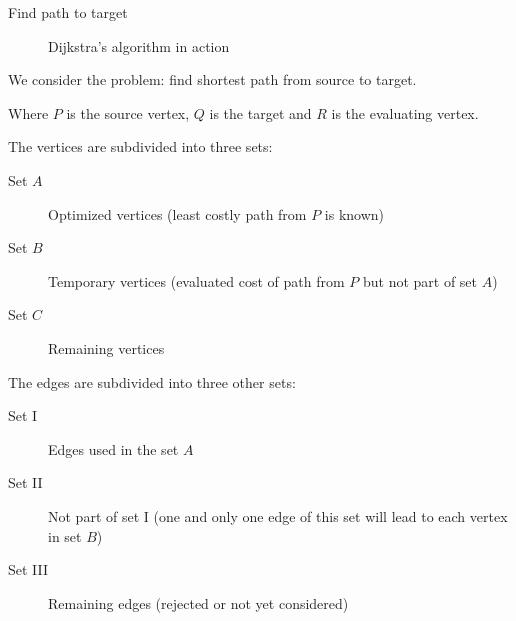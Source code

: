 \begin{algorithm} \label{algo:FindPath}
  \caption{Find path to target}


\end{algorithm}

  \begin{figure}[ht!]
    \centering
    \caption{Dijkstra's algorithm in action}
    \label{fig:dijkstra}
  \end{figure}

  We consider the problem: find shortest path from source to target.

  Where $P$ is the source vertex, $Q$ is the target and $R$ is the evaluating vertex.

  The vertices are subdivided into three sets:

  \begin{description}
    \item[Set $A$]{Optimized vertices (least costly path from $P$ is known)}
    \item[Set $B$]{Temporary vertices (evaluated cost of path from $P$ but not part of set $A$)}
    \item[Set $C$]{Remaining vertices}
  \end{description}

  The edges are subdivided into three other sets:

  \begin{description}
    \item[Set \RN{1}]{Edges used in the set $A$}
    \item[Set \RN{2}]{Not part of set I (one and only one edge of this set will lead to each vertex in set $B$)}
    \item[Set \RN{3}]{Remaining edges (rejected or not yet considered)}
  \end{description}

